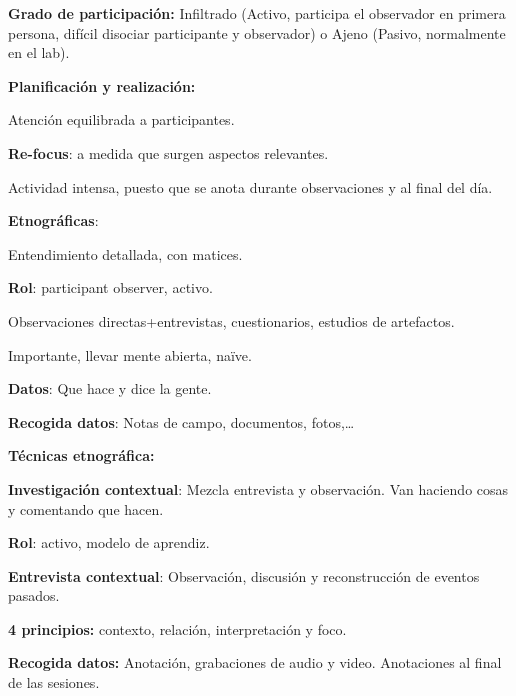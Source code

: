 \documentclass[12pt]{report} %
\begin{document}
\textbf{Grado de participación:} Infiltrado (Activo, participa el
observador en primera persona, difícil disociar participante y
observador) o Ajeno (Pasivo, normalmente en el lab).

\textbf{Planificación y realización:}

\hspace{0pt} Atención equilibrada a participantes.

\hspace{0pt} \textbf{Re-focus}: a medida que surgen aspectos
relevantes.

\hspace{0pt} Actividad intensa, puesto que se anota durante
observaciones y al final del día.

\textbf{Etnográficas}:

\hspace{6mm} Entendimiento detallada, con matices.

\hspace{6mm} \textbf{Rol}: participant observer, activo.

\hspace{6mm} Observaciones directas+entrevistas, cuestionarios, estudios
de artefactos.

\hspace{6mm} Importante, llevar mente abierta, naïve.

\hspace{6mm} \textbf{Datos}: Que hace y dice la gente.

\hspace{6mm} \textbf{Recogida datos}: Notas de campo, documentos,
fotos,\ldots{}

\textbf{Técnicas etnográfica:}

\hspace{6mm} \textbf{Investigación contextual}: Mezcla entrevista y observación. Van haciendo cosas y comentando que hacen.

\hspace{6mm} \textbf{Rol}: activo, modelo de aprendiz.

\hspace{6mm} \textbf{Entrevista contextual}: Observación, discusión y
reconstrucción de eventos pasados.

\hspace{6mm} \textbf{4 principios:} contexto, relación, interpretación y
foco.

\hspace{6mm} \textbf{Recogida datos:} Anotación, grabaciones de audio y
video. Anotaciones al final de las sesiones.
\end{document}
